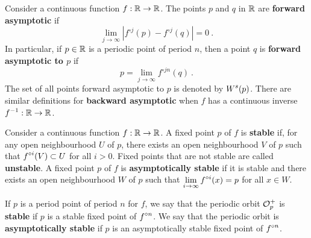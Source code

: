 \begin{defn}
Consider a continuous function $f:\mathbb{R} \rightarrow \mathbb{R}$.  The points
$p$ and $q$ in $\mathbb{R}$ are
{\bfseries forward asymptotic} if
\[
\lim_{j\rightarrow \infty} \left| f^{\circ j}(p) - f^{\circ j}(q) \right| = 0 \ .
\]
In particular, if $p \in \mathbb{R}$ is a periodic point of period $n$, then a
point $q$ is
{\bfseries forward asymptotic to $p$} if
\[
p = \lim_{j\rightarrow \infty} f^{\circ jn}(q) \  .
\]
The set of all points forward asymptotic to $p$ is denoted by
$\displaystyle W^s(p)$.  There are similar definitions for
{\bfseries backward asymptotic} when
$f$ has a continuous inverse $\displaystyle f^{-1}:\mathbb{R}\rightarrow \mathbb{R}$.
\end{defn}

\begin{defn}
Consider a continuous function $f:\mathbb{R} \rightarrow \mathbb{R}$.
A fixed point $p$ of $f$ is {\bfseries stable} if, for any open
neighbourhood $U$ of $p$, there exists an open neighbourhood $V$ of $p$
such that $\displaystyle f^{\circ i}(V) \subset U$ for all $i > 0$.  Fixed
points that are not stable are called
{\bfseries unstable}.   A fixed point $p$ of
$f$ is {\bfseries asymptotically stable} if it is
stable and there exists an open neighbourhood $W$ of $p$ such that
$\displaystyle \lim_{i\rightarrow \infty} f^{\circ i}(x) = p$ for all
$x\in W$.

If $p$ is a period point of period $n$ for $f$, we say that the
periodic orbit $\displaystyle \mathcal{O}_p^+$ is
{\bfseries stable} if $p$ is a stable
fixed point of $\displaystyle f^{\circ n}$.  We say that the periodic orbit is
{\bfseries asymptotically stable} if $p$
is an asymptotically stable fixed point of $\displaystyle f^{\circ n}$.
\end{defn}

